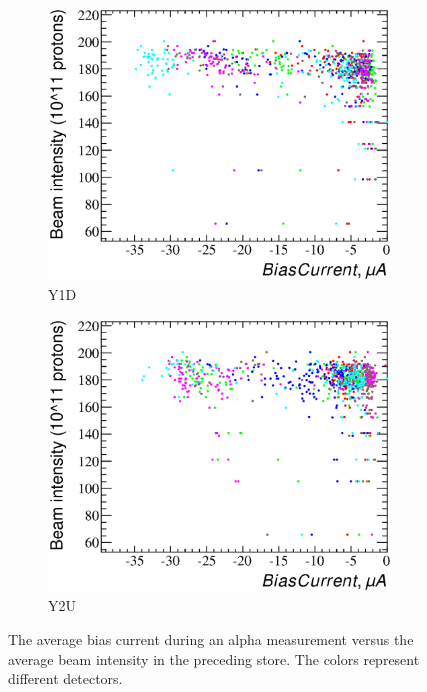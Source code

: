 \documentclass[a4paper,12pt]{article}
\begin{document}
\begin{figure}
\begin{subfigure}[t]{0.5\textwidth}
\includegraphics[width=\textwidth]{gfx/run13_alpha_study_novoltagevariation/Y1D/c_hBiasCurrent_BeamCurrent.eps}
\caption{Y1D}
\end{subfigure}
%
\begin{subfigure}[t]{0.5\textwidth}
\includegraphics[width=\textwidth]{gfx/run13_alpha_study_novoltagevariation/Y2U/c_hBiasCurrent_BeamCurrent.eps}
\caption{Y2U}
\end{subfigure}
%
\caption{The average bias current during an alpha measurement versus the average
beam intensity in the preceding store. The colors represent different
detectors.}
\label{fig:bc_vs_beamcurrent}
\end{figure}
\end{document}
